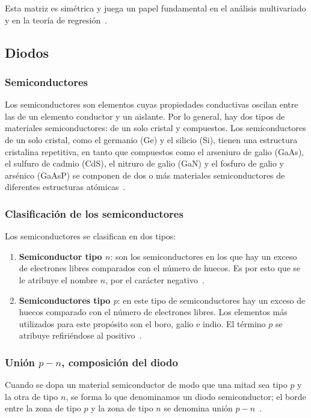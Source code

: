 \documentclass[twocolumn]{article} %
\begin{document}
Esta matriz es simétrica y juega un papel fundamental en el análisis multivariado y en la teoría de regresión~\cite{marques1991probabilidad}.
\subsection{Diodos}

\subsubsection{Semiconductores}
Los semiconductores son elementos cuyas propiedades conductivas oscilan entre las de un elemento conductor y un aislante. Por lo general, hay dos tipos de materiales semiconductores: de un solo cristal y compuestos. Los semiconductores de un solo cristal, como el germanio (Ge) y el silicio (Si), tienen una estructura cristalina repetitiva, en tanto que compuestos como el arseniuro de galio (GaAs), el sulfuro de cadmio (CdS), el nitruro de galio (GaN) y el fosfuro de galio y arsénico (GaAsP) se componen de dos o más materiales semiconductores de diferentes estructuras atómicas~\cite{rosadio}.

\subsubsection{Clasificación de los semiconductores}
Los semiconductores se clasifican en dos tipos:
\begin{enumerate}
    \item \textbf{Semiconductor tipo $n$}: son los semiconductores en los que hay un exceso de electrones libres comparados con el número de huecos. Es por esto que se le atribuye el nombre $n$, por el carácter negativo~\cite{rosadio}.
    \item \textbf{Semiconductores tipo $p$}: en este tipo de semiconductores hay un exceso de huecos comparado con el número de electrones libres. Los elementos más utilizados para este propósito son el boro, galio e indio. El término $p$ se atribuye refiriéndose al positivo~\cite{rosadio}.
\end{enumerate}

\subsubsection{Unión $p-n$, composición del diodo}
Cuando se dopa un material semiconductor de modo que una mitad sea tipo $p$ y la otra de tipo $n$, se forma lo que denominamos un diodo semiconductor; el borde entre la zona de tipo $p$ y la zona de tipo $n$ se denomina unión $p-n$~\cite{rosadio}.
\end{document}
